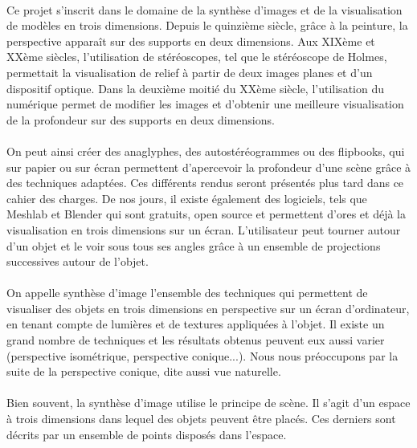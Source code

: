 \paragraph{}
	Ce projet s’inscrit dans le domaine de la synthèse d’images et de la visualisation de modèles en trois dimensions. Depuis le quinzième siècle, grâce à la peinture, la perspective apparaît sur des supports en deux dimensions. Aux XIXème et XXème siècles, l’utilisation de stéréoscopes, tel que le stéréoscope de Holmes, permettait la visualisation de relief à partir de deux images planes et d’un dispositif optique. Dans la deuxième moitié du XXème siècle, l’utilisation du numérique permet de modifier les images et d’obtenir une meilleure visualisation de la profondeur sur des supports en deux dimensions. 

\paragraph{}	
	On peut ainsi créer des anaglyphes, des autostéréogrammes ou des flipbooks, qui sur papier ou sur écran permettent d’apercevoir la profondeur d’une scène grâce à des techniques adaptées. Ces différents rendus seront présentés plus tard dans ce cahier des charges. De nos jours, il existe également des logiciels, tels que Meshlab et Blender qui sont gratuits, open source et permettent d’ores et déjà la visualisation en trois dimensions sur un écran. L’utilisateur peut tourner autour d’un objet et le voir sous tous ses angles grâce à un ensemble de projections successives autour de l’objet.

\paragraph{}
	On appelle synthèse d’image l'ensemble des techniques qui permettent de visualiser des objets en trois dimensions en perspective sur un écran d'ordinateur, en tenant compte de lumières et de textures appliquées à l'objet. Il existe un grand nombre de techniques et les résultats obtenus peuvent eux aussi varier (perspective isométrique, perspective conique...). Nous nous préoccupons par la suite de la perspective conique, dite aussi vue naturelle. 

\paragraph{}
	Bien souvent, la synthèse d'image utilise le principe de scène. Il s'agit d'un espace à trois dimensions dans lequel des objets peuvent être placés. Ces derniers sont décrits par un ensemble de points disposés dans l'espace.

